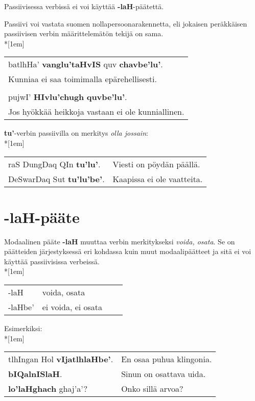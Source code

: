 \documentclass{book}
\begin{document}
Passiivisessa verbissä ei voi käyttää \textbf{-laH}-päätettä.

Passiivi voi vastata suomen nollapersoonarakennetta, eli jokaisen peräkkäisen passiivisen verbin määrittelemätön tekijä on sama.\\*[1em]
\begin{tabular}{l}
    batlhHa' \textbf{vanglu'taHvIS} quv \textbf{chavbe'lu'}. \\
    Kunniaa ei saa toimimalla epärehellisesti. \\
    \\
    pujwI' \textbf{HIvlu'chugh} \textbf{quvbe'lu'}. \\
    Jos hyökkää heikkoja vastaan ei ole kunniallinen. \\
\end{tabular}

\textbf{tu'}-verbin passiivilla on merkitys \textit{olla jossain}:
\\*[1em]
\begin{tabular}{l l}
    raS DungDaq QIn \textbf{tu'lu'}. & Viesti on pöydän päällä. \\
    DeSwarDaq Sut \textbf{tu'lu'be'}. & Kaapissa ei ole vaatteita. \\
\end{tabular}

\section{-laH-pääte}
\label{sec:laH}

Modaalinen pääte \textbf{-laH} muuttaa verbin merkitykseksi \textit{voida, osata}.
Se on päätteiden järjestyksessä eri kohdassa kuin muut modaalipäätteet ja sitä ei voi käyttää passiivisissa verbeissä.\\*[1em]
\begin{tabular}{Bl Il}
    -laH & voida, osata \\
    -laHbe' & ei voida, ei osata \\
\end{tabular}

Esimerkiksi:\\*[1em]
\begin{tabular}{l l}
    tlhIngan Hol \textbf{vIjatlhlaHbe'}. & En osaa puhua klingonia. \\
    \textbf{bIQalnISlaH}. & Sinun on osattava uida. \\
    \textbf{lo'laHghach} ghaj'a'? & Onko sillä arvoa? \\
\end{tabular}
\end{document}

